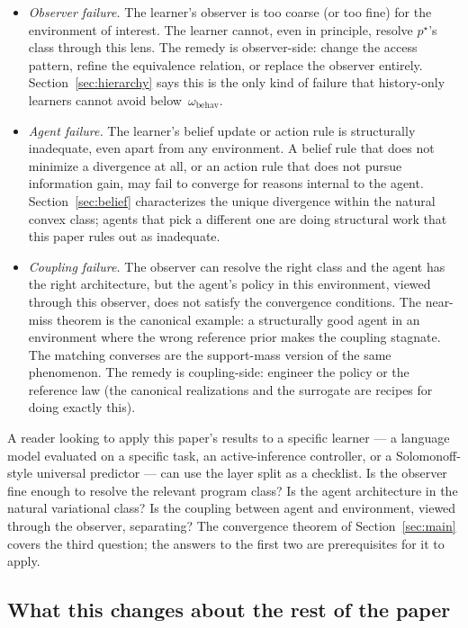 \documentclass[11pt]{article}
\theoremstyle{definition}
\theoremstyle{remark}
\begin{document}
\begin{itemize}
\item \emph{Observer failure.} The learner's observer is too coarse (or too fine) for the environment of interest. The learner cannot, even in principle, resolve $p^\star$'s class through this lens. The remedy is observer-side: change the access pattern, refine the equivalence relation, or replace the observer entirely. Section~\ref{sec:hierarchy} says this is the only kind of failure that history-only learners cannot avoid below~$\omega_{\mathrm{behav}}$.
\item \emph{Agent failure.} The learner's belief update or action rule is structurally inadequate, even apart from any environment. A belief rule that does not minimize a divergence at all, or an action rule that does not pursue information gain, may fail to converge for reasons internal to the agent. Section~\ref{sec:belief} characterizes the unique divergence within the natural convex class; agents that pick a different one are doing structural work that this paper rules out as inadequate.
\item \emph{Coupling failure.} The observer can resolve the right class and the agent has the right architecture, but the agent's policy in this environment, viewed through this observer, does not satisfy the convergence conditions. The near-miss theorem is the canonical example: a structurally good agent in an environment where the wrong reference prior makes the coupling stagnate. The matching converses are the support-mass version of the same phenomenon. The remedy is coupling-side: engineer the policy or the reference law (the canonical realizations and the surrogate are recipes for doing exactly this).
\end{itemize}

A reader looking to apply this paper's results to a specific learner --- a language model evaluated on a specific task, an active-inference controller, or a Solomonoff-style universal predictor --- can use the layer split as a checklist. Is the observer fine enough to resolve the relevant program class? Is the agent architecture in the natural variational class? Is the coupling between agent and environment, viewed through the observer, separating? The convergence theorem of Section~\ref{sec:main} covers the third question; the answers to the first two are prerequisites for it to apply.

\subsection{What this changes about the rest of the paper}
\label{sec:ontology-roadmap}
\end{document}
